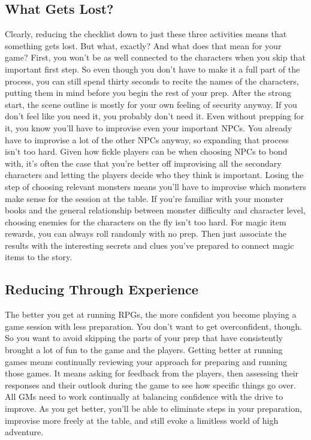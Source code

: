 \documentclass[10pt,a4paper,twoside,bg=print,twocolumn,openany,nodeprecatedcode]{dndbook}
\begin{document}
\subsection{What Gets Lost?}
Clearly, reducing the checklist down to just these three activities means that something gets lost. But what, exactly? And what does that mean for your game?
First, you won't be as well connected to the characters when you skip that important first step. So even though you don't have to make it a full part of the process, you can still spend thirty seconds to recite the names of the characters, putting them in mind before you begin the rest of your prep.
After the strong start, the scene outline is mostly for your own feeling of security anyway. If you don't feel like you need it, you probably don't need it.
Even without prepping for it, you know you'll have to improvise even your important NPCs. You already have to improvise a lot of the other NPCs anyway, so expanding that process isn't too hard. Given how fickle players can be when choosing NPCs to bond with, it's often the case that you're better off improvising all the secondary characters and letting the players decide who they think is important.
Losing the step of choosing relevant monsters means you'll have to improvise which monsters make sense for the session at the table. If you're familiar with your monster books and the general relationship between monster difficulty and character level, choosing enemies for the characters on the fly isn't too hard.
For magic item rewards, you can always roll randomly with no prep. Then just associate the results with the interesting secrets and clues you've prepared to connect magic items to the story.
\subsection{Reducing Through Experience}
The better you get at running RPGs, the more confident you become playing a game session with less preparation. You don't want to get overconfident, though. So you want to avoid skipping the parts of your prep that have consistently brought a lot of fun to the game and the players.
Getting better at running games means continually reviewing your approach for preparing and running those games. It means asking for feedback from the players, then assessing their responses and their outlook during the game to see how specific things go over. All GMs need to work continually at balancing confidence with the drive to improve.
As you get better, you'll be able to eliminate steps in your preparation, improvise more freely at the table, and still evoke a limitless world of high adventure.
\end{document}
